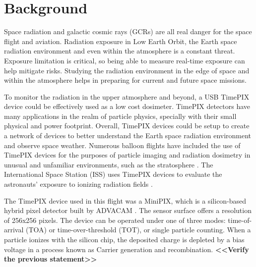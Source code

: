 %
%
%
\section{Background}
\label{Background}
Space radiation and galactic cosmic rays (GCRs) are all real danger for the space flight and aviation.  Radiation exposure in Low Earth Orbit, the Earth space radiation environment and even within the atmosphere is a constant threat. Exposure limitation is critical, so being able to measure real-time exposure can help mitigate risks.  Studying the radiation environment in the edge of space and within the atmosphere helps in preparing for current and future space missions.  

To monitor the radiation in the upper atmosphere and beyond, a USB TimePIX device could be effectively used as a low cost dosimeter.  TimePIX detectors have many applications in the realm of particle physics, specially with their small physical and power footprint. Overall, TimePIX devices could be setup to create a network of devices to better understand the Earth space radiation environment and observe space weather.
%
%
%
%
Numerous balloon flights have included the use of TimePIX devices for the purposes of particle imaging and radiation dosimetry in unusual and unfamiliar environments, such as the stratosphere \cite{bexus}. 
%
The International Space Station (ISS) uses TimePIX devices to evaluate the astronauts' exposure to ionizing radiation fields \cite{timepix}.

The TimePIX device used in this flight was a MiniPIX, which is a silicon-based hybrid pixel detector built by ADVACAM \cite{advacam}. 
%
The sensor surface offers a resolution of 256x256 pixels.
%
The device can be operated under one of three modes: time-of-arrival (TOA) or time-over-threshold (TOT), or single particle counting. 
%
When a particle ionizes with the silicon chip, the deposited charge is depleted by a bias voltage in a process known as Carrier generation and recombination. \textbf{<<Verify the previous statement>>}

